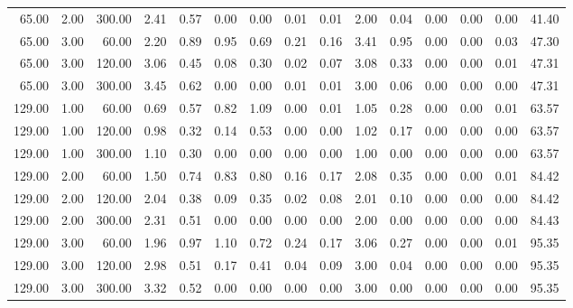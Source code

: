 \begin{table}[ht]
\begin{tabular}{rrrrrrrrrrrrrrr}
  65.00 & 2.00 & 300.00 & 2.41 & 0.57 & 0.00 & 0.00 & 0.01 & 0.01 & 2.00 & 0.04 & 0.00 & 0.00 & 0.00 & 41.40 \\ 
  65.00 & 3.00 & 60.00 & 2.20 & 0.89 & 0.95 & 0.69 & 0.21 & 0.16 & 3.41 & 0.95 & 0.00 & 0.00 & 0.03 & 47.30 \\ 
  65.00 & 3.00 & 120.00 & 3.06 & 0.45 & 0.08 & 0.30 & 0.02 & 0.07 & 3.08 & 0.33 & 0.00 & 0.00 & 0.01 & 47.31 \\ 
  65.00 & 3.00 & 300.00 & 3.45 & 0.62 & 0.00 & 0.00 & 0.01 & 0.01 & 3.00 & 0.06 & 0.00 & 0.00 & 0.00 & 47.31 \\ 
  129.00 & 1.00 & 60.00 & 0.69 & 0.57 & 0.82 & 1.09 & 0.00 & 0.01 & 1.05 & 0.28 & 0.00 & 0.00 & 0.01 & 63.57 \\ 
  129.00 & 1.00 & 120.00 & 0.98 & 0.32 & 0.14 & 0.53 & 0.00 & 0.00 & 1.02 & 0.17 & 0.00 & 0.00 & 0.00 & 63.57 \\ 
  129.00 & 1.00 & 300.00 & 1.10 & 0.30 & 0.00 & 0.00 & 0.00 & 0.00 & 1.00 & 0.00 & 0.00 & 0.00 & 0.00 & 63.57 \\ 
  129.00 & 2.00 & 60.00 & 1.50 & 0.74 & 0.83 & 0.80 & 0.16 & 0.17 & 2.08 & 0.35 & 0.00 & 0.00 & 0.01 & 84.42 \\ 
  129.00 & 2.00 & 120.00 & 2.04 & 0.38 & 0.09 & 0.35 & 0.02 & 0.08 & 2.01 & 0.10 & 0.00 & 0.00 & 0.00 & 84.42 \\ 
  129.00 & 2.00 & 300.00 & 2.31 & 0.51 & 0.00 & 0.00 & 0.00 & 0.00 & 2.00 & 0.00 & 0.00 & 0.00 & 0.00 & 84.43 \\ 
  129.00 & 3.00 & 60.00 & 1.96 & 0.97 & 1.10 & 0.72 & 0.24 & 0.17 & 3.06 & 0.27 & 0.00 & 0.00 & 0.01 & 95.35 \\ 
  129.00 & 3.00 & 120.00 & 2.98 & 0.51 & 0.17 & 0.41 & 0.04 & 0.09 & 3.00 & 0.04 & 0.00 & 0.00 & 0.00 & 95.35 \\ 
  129.00 & 3.00 & 300.00 & 3.32 & 0.52 & 0.00 & 0.00 & 0.00 & 0.00 & 3.00 & 0.00 & 0.00 & 0.00 & 0.00 & 95.35 \\ 
   \hline
\end{tabular}
\end{table}
